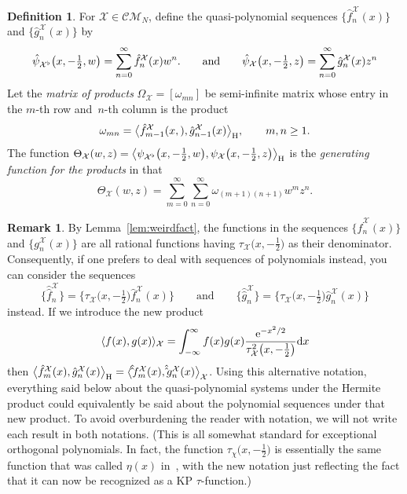 \documentclass[10pt,a4paper]{amsart}
\numberwithin{equation}{section}
\theoremstyle{definition}
\newtheorem{Definition}[Theorem]{Definition}
\newtheorem{Remark}[Theorem]{Remark}
\def\X{\mathcal{X}}
\def\CM{\mathcal{C\!M}}
\def\ff{\hat f}
\def\gg{\hat g}
\def\fff{\hat \ff}
\def\ggg{\hat \gg}
\begin{document}
\begin{Definition}\label{def:seqs}
For $\X\in\CM_N$, define the quasi-polynomial sequences $\big\{\ff_n^{\X}(x)\big\}$ and
$\big\{\gg_n^{\X}(x)\big\}$
by
\[
\hat\psi_{\X^\flat}\bigl(x,-\tfrac{1}{2},w\bigr)=\sum_{n=0}^\infty \ff_n^{\X}(x)w^n.
\qquad\hbox{and}\qquad
\hat\psi_{\X}\bigl(x,-\tfrac{1}{2},z\bigr)=\sum_{n=0}^\infty \gg_n^{\X}(x)z^n
\]
Let the \textit{matrix of products} $\Omega_{\X}=[\omega_{mn}]$ be
 semi-infinite matrix whose entry in the $m$-th row and~$n$-th
 column is the product
 \[
\omega_{mn}=\big\langle \ff_{m-1}^{\X}(x,),\gg_{n-1}^{\X}(x)\big\rangle_{\rm H}, \qquad
m,n\geq 1.
 \]
The function $\Theta_{\X}(w,z)=\bigl\langle \psi_{\X^\flat}\bigl(x,-\tfrac{1}{2},w\bigr),\psi_{\X}\bigl(x,-\tfrac{1}{2},z\bigr)\bigr\rangle_{\rm H}$ is the
\textit{generating function for the products}
 in that
\[
\Theta_{\X}(w,z)=\sum_{m=0}^{\infty}\sum_{n=0}^{\infty}
\omega_{(m+1)(n+1)}w^mz^n.
\]
\end{Definition}

\begin{Remark}\label{rem:quasi}
By Lemma~\ref{lem:weirdfact}, the functions in the sequences $\big\{\ff_n^{\X}(x)\big\}$ and
$\big\{g_n^{\X}(x)\big\}$ are all rational functions having
$\tau_{\X}\bigl(x,-\tfrac{1}{2}\bigr)$ as their
denominator. Consequently, if one prefers to deal with sequences of
polynomials instead, you can consider the sequences
\[
\big\{\fff_n^{\X}\big\}=\bigl\{\tau_{\X}\bigl(x,-\tfrac{1}{2}\bigr)\ff_n^{\X}(x)\bigr\}\qquad\text{and}\qquad
\big\{\ggg_n^{\X}\big\}=\bigl\{\tau_{\X}\bigl(x,-\tfrac{1}{2}\bigr)\gg_n^{\X}(x)\bigr\}
\]
instead.
If we introduce the new product
\[
\langle f(x),g(x)\rangle_{\X}=\int_{-\infty}^{\infty}
f(x)g(x)\frac{{\rm e}^{-x^2/2}}{\tau_{\X}^2\bigl(x,-\tfrac{1}{2}\bigr)}{\rm d}x
\]
then $\big\langle \ff_m^{\X}(x),\gg_n^{\X}(x)\big\rangle_{\rm H}=\big\langle
\fff_m^{\X}(x),\ggg_n^{\X}(x)\big\rangle_{\X}$. Using this alternative
notation, everything said below
about the quasi-polynomial systems under the Hermite product
could equivalently be said about the polynomial sequences under that
new product. To avoid overburdening the reader with notation, we
will not write each result in both notations. (This is all somewhat
standard for exceptional orthogonal polynomials. In fact, the
function $\tau_\chi\bigl(x,-\tfrac{1}{2}\bigr)$ is essentially the same function that was
called $\eta(x)$ in~\cite{XHermite2}, with the new notation just
reflecting the fact that it can now be recognized as a KP $\tau$-function.)
\end{Remark}
\end{document}

